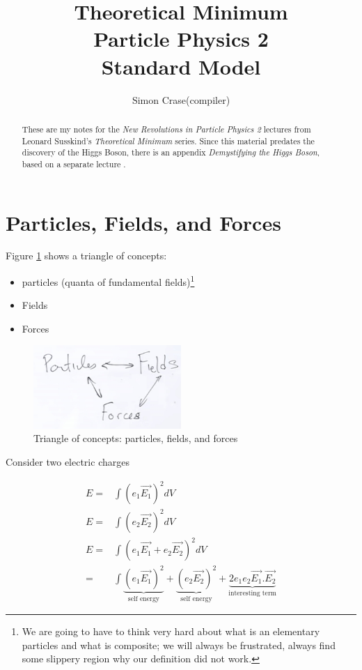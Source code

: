 \documentclass[]{article}
\title{Theoretical Minimum\\Particle Physics 2\\Standard Model}
\author{Simon Crase(compiler)}
\begin{document}
\maketitle

\begin{abstract}
These are my notes for the \emph{New Revolutions in Particle Physics 2} lectures from Leonard Susskind's \emph{Theoretical Minimum} series\cite{susskind2009standard}. Since this material predates the discovery of the Higgs Boson, there is an appendix \emph{Demystifying the Higgs Boson}, based on a separate lecture \cite{susskind2010demystifing}.
\end{abstract}

\tableofcontents
\listoffigures
\listoftables
\listoftheorems

\section{Particles, Fields, and Forces}

Figure \ref{fig:particles:fields:forces} shows a triangle of concepts:
\begin{itemize}
	\item particles (quanta of fundamental fields)\footnote{We are going to have to think very hard about what is an elementary particles and what is composite; we will always be frustrated, always find some slippery region why our definition did not work.}
	\item Fields
	\item Forces
\end{itemize}

\begin{figure}[H]
	\begin{center}
		\caption{Triangle of concepts: particles, fields, and forces}\label{fig:particles:fields:forces}
		\includegraphics[width=0.5\textwidth]{ParticlesFieldsForces}
	\end{center}
\end{figure}

Consider two electric charges

\begin{align*}
E=&\int (e_1 \vec{E_1})^2 dV\\
E=&\int (e_2 \vec{E_2})^2 dV\\
E=&\int (e_1\vec{E_1}+e_2 \vec{E_2})^2 dV\\
=&\int \underbrace{(e_1\vec{E_1})^2}_\text{self energy}+ \underbrace{(e_2\vec{E_2})^2}_\text{self energy} + \underbrace{2e_1e_2\vec{E_1}.\vec{E_2}}_\text{interesting term}
\end{align*}
\end{document}
